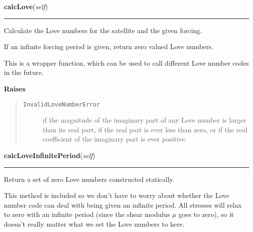     \vspace{0.5ex}

\hspace{.8\funcindent}\begin{boxedminipage}{\funcwidth}

    \raggedright \textbf{calcLove}(\textit{self})

    \vspace{-1.5ex}

    \rule{\textwidth}{0.5\fboxrule}
\setlength{\parskip}{2ex}
    Calculate the Love numbers for the satellite and the given forcing.

    If an infinite forcing period is given, return zero valued Love 
    numbers.

    This is a wrapper function, which can be used to call different Love 
    number codes in the future.

\setlength{\parskip}{1ex}
      \textbf{Raises}
    \vspace{-1ex}

      \begin{quote}
        \begin{description}

          \item[\texttt{InvalidLoveNumberError}]

          if the magnitude of the imaginary part of any Love number is 
          larger than its real part, if the real part is ever less than 
          zero, or if the real coefficient of the imaginary part is ever 
          positive.

        \end{description}

      \end{quote}

    \end{boxedminipage}

    \label{SatStress:SatStress:StressDef:calcLoveInfinitePeriod}

    \vspace{0.5ex}

\hspace{.8\funcindent}\begin{boxedminipage}{\funcwidth}

    \raggedright \textbf{calcLoveInfinitePeriod}(\textit{self})

    \vspace{-1.5ex}

    \rule{\textwidth}{0.5\fboxrule}
\setlength{\parskip}{2ex}
    Return a set of zero Love numbers constructed statically.

    This method is included so we don't have to worry about whether the 
    Love number code can deal with being given an infinite period.  All 
    stresses will relax to zero with an infinite period (since the shear 
    modulus \(\mu\) goes to zero), so it doesn't really matter what we set 
    the Love numbers to here.

\setlength{\parskip}{1ex}
    \end{boxedminipage}

